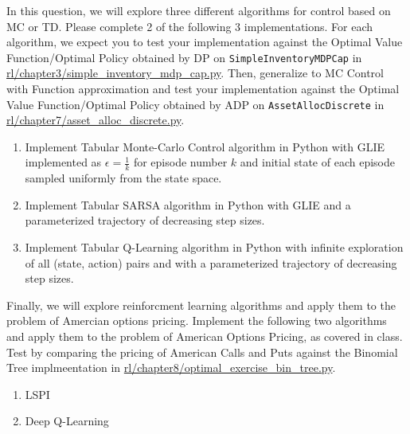 \documentclass[12pt]{exam}
\begin{document}
\begin{questions}
\question In this question, we will explore three different algorithms for control based on MC or TD. Please complete 2 of the following 3 implementations. For each algorithm, we expect you to test your implementation against the Optimal Value Function/Optimal Policy obtained by DP on \lstinline{SimpleInventoryMDPCap} in \href{https://github.com/TikhonJelvis/RL-book/blob/master/rl/chapter3/simple_inventory_mdp_cap.py}{rl\//chapter3\//simple\_inventory\_mdp\_cap.py}. Then, generalize to MC Control with Function approximation and test your implementation against the Optimal Value Function/Optimal Policy obtained by ADP on \lstinline{AssetAllocDiscrete} in \href{https://github.com/TikhonJelvis/RL-book/blob/master/rl/chapter7/asset_alloc_discrete.py}{rl\//chapter7\//asset\_alloc\_discrete.py}.

\begin{enumerate}
	\item Implement Tabular Monte-Carlo Control algorithm in Python with GLIE implemented as $\epsilon = \frac 1 k$ for episode number $k$ and initial state of each episode sampled uniformly from the state space.
	\item Implement Tabular SARSA algorithm in Python with GLIE and a parameterized trajectory of decreasing step sizes.
	\item Implement Tabular Q-Learning algorithm in Python with infinite exploration of all (state, action) pairs and with a parameterized trajectory of decreasing step sizes.
\end{enumerate}

\question Finally, we will explore reinforcment learning algorithms and apply them to the problem of Amercian options pricing. Implement the following two algorithms and apply them to the problem of American Options Pricing, as covered in class. Test by comparing the pricing of American Calls and Puts against the Binomial Tree implmeentation in \href{https://github.com/TikhonJelvis/RL-book/blob/master/rl/chapter8/optimal_exercise_bin_tree.py}{rl\//chapter8\//optimal\_exercise\_bin\_tree.py}.

\begin{enumerate}
	\item LSPI
	\item Deep Q-Learning
\end{enumerate}
\end{questions}
\end{document}
